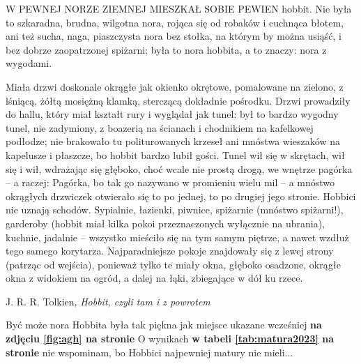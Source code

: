 \par
W PEWNEJ NORZE ZIEMNEJ MIESZKAŁ SOBIE PEWIEN hobbit. Nie była to szkaradna, brudna, wilgotna nora, rojąca się od robaków i cuchnąca błotem, ani też sucha, naga, piaszczysta nora bez stołka, na którym by można usiąść, i bez dobrze zaopatrzonej spiżarni; była to nora hobbita, a to znaczy: nora z wygodami.\par Miała drzwi doskonale okrągłe jak okienko okrętowe, pomalowane na zielono, z lśniącą, żółtą mosiężną klamką, sterczącą dokładnie pośrodku. Drzwi prowadziły do hallu, który miał kształt rury i wyglądał jak tunel: był to bardzo wygodny tunel, nie zadymiony, z boazerią na ścianach i chodnikiem na kafelkowej podłodze; nie brakowało tu politurowanych krzeseł ani mnóstwa wieszaków na kapelusze i płaszcze, bo hobbit bardzo lubił gości. Tunel wił się w skrętach, wił się i wił, wdrażając się głęboko, choć wcale nie prostą drogą, we wnętrze pagórka – a raczej: Pagórka, bo tak go nazywano w promieniu wielu mil – a mnóstwo okrągłych drzwiczek otwierało się to po jednej, to po drugiej jego stronie. Hobbici nie uznają schodów. Sypialnie, łazienki, piwnice, spiżarnie (mnóstwo spiżarni!), garderoby (hobbit miał kilka pokoi przeznaczonych wyłącznie na ubrania), kuchnie, jadalnie – wszystko mieściło się na tym samym piętrze, a nawet wzdłuż tego samego korytarza. Najparadniejsze pokoje znajdowały się z lewej strony (patrząc od wejścia), ponieważ tylko te miały okna, głęboko osadzone, okrągłe okna z widokiem na ogród, a dalej na łąki, zbiegające w dół ku rzece.\par
\begin{flushright}
J. R. R. Tolkien, \textit{Hobbit, czyli tam i z powrotem}
\end{flushright}
\par
\begingroup
    \centering
    Być może nora Hobbita była tak piękna jak miejsce ukazane wcześniej \textbf{na zdjęciu \ref{fig:agh} na stronie \pageref{fig:agh}} \Huge{\smiley{}} %
    \normalsize
    O wynikach \textbf{w tabeli \ref{tab:matura2023} na stronie \pageref{tab:matura2023}} nie wspominam, bo Hobbici najpewniej matury nie mieli... \Huge{\frownie{}}
\endgroup